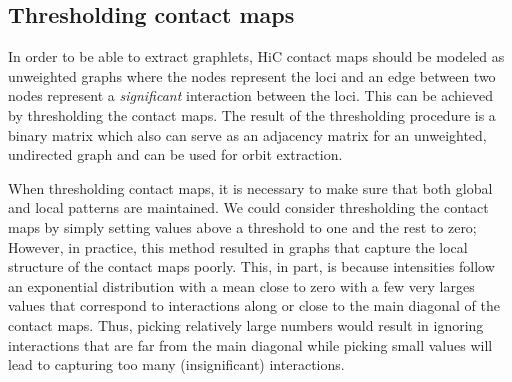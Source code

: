 \documentclass[a4,center,fleqn]{NAR}
\begin{document}
\subsection{Thresholding contact maps}
In order to be able to extract graphlets, HiC contact maps should be modeled as
unweighted graphs where the nodes represent the loci and an edge between two 
nodes represent a \textit{significant} interaction between the loci.
This can be achieved by thresholding the contact maps. The result
of the thresholding procedure is a binary matrix which also can serve as
an adjacency matrix for an unweighted, undirected graph and can be
used for orbit extraction.

When thresholding contact maps, it is necessary to make sure
that both global and local patterns are maintained. We could consider 
thresholding the contact maps by simply setting values above a threshold to
one and the rest to zero; However, in practice, this method resulted in graphs
that capture the local structure of the contact maps poorly. 
This, in part, is because
intensities follow an exponential distribution with a mean close to zero
with a few very larges values that correspond to interactions along 
or close to the main diagonal of the contact maps.
Thus, picking relatively large numbers would result in ignoring interactions
that are far from the main diagonal while picking small values will lead to
capturing too many (insignificant) interactions.
\end{document}
